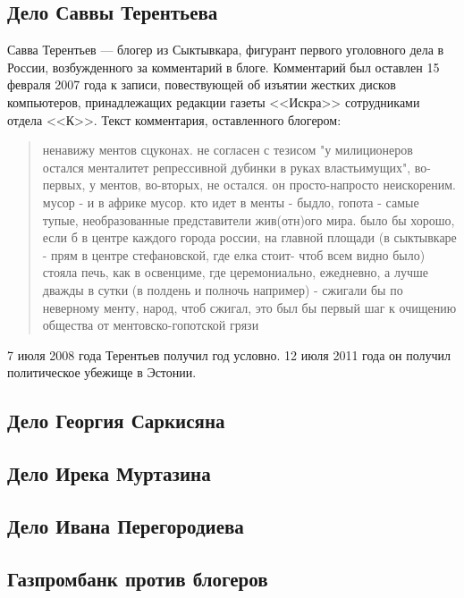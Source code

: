 \subsection{Дело Саввы Терентьева}
Савва Терентьев --- блогер из Сыктывкара, фигурант первого уголовного дела в России, возбужденного за комментарий в блоге. Комментарий был оставлен 15 февраля 2007 года к записи, повествующей об изъятии жестких дисков компьютеров, принадлежащих редакции газеты <<Искра>> сотрудниками отдела <<К>>\cite{terentyev_k}.
Текст комментария, оставленного блогером\cite{terentyev_quote}:
\begin{quote}ненавижу ментов сцуконах. не согласен с тезисом "у милиционеров остался менталитет репрессивной дубинки в руках властьимущих", во-первых, у ментов, во-вторых, не остался. он просто-напросто неискореним. мусор - и в африке мусор. кто идет в менты - быдло, гопота - самые тупые, необразованные представители жив(отн)ого мира. было бы хорошо, если б в центре каждого города россии, на главной площади (в сыктывкаре - прям в центре стефановской, где елка стоит- чтоб всем видно было) стояла печь, как в освенциме, где церемониально, ежедневно, а лучше дважды в сутки (в полдень и полночь например) - сжигали бы по неверному менту, народ, чтоб сжигал, это был бы первый шаг к очищению общества от ментовско-гопотской грязи\end{quote}
7 июля 2008 года Терентьев получил год условно\cite{terentyev_year}. 12 июля 2011 года он получил политическое убежище в Эстонии\cite{terentyev_estonia}.
\subsection{Дело Георгия Саркисяна}
\subsection{Дело Ирека Муртазина}
\subsection{Дело Ивана Перегородиева}
\subsection{Газпромбанк против блогеров}